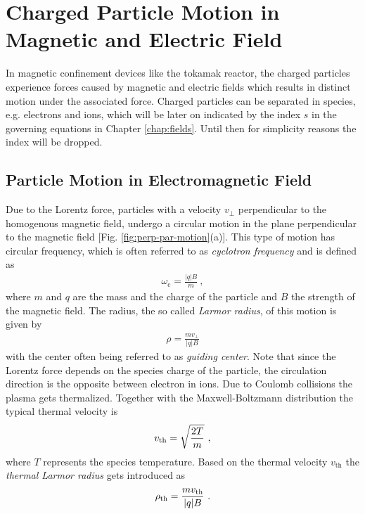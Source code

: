 \section{Charged Particle Motion in Magnetic and Electric Field}
\label{sec:motion}

In magnetic confinement devices like the tokamak reactor, the charged particles experience forces caused by magnetic and electric fields which results in distinct motion under the associated force. Charged particles can be separated in species, e.g. electrons and ions, which will be later on indicated by the index $s$ in the governing equations in Chapter \ref{chap:fields}. Until then for simplicity reasons the index will be dropped.

\subsection{Particle Motion in Electromagnetic Field}
\label{sub:motion}

Due to the Lorentz force, particles with a velocity $v_{\perp}$ perpendicular to the homogenous magnetic field, undergo a circular motion in the plane perpendicular to the magnetic field [Fig. \ref{fig:perp-par-motion}(a)]. This type of motion has circular frequency, which is often referred to as \textit{cyclotron frequency} and is defined as
\begin{gather}
    \omega_\mathrm{c} = \frac{|q|B}{m}~,
    \label{eq:cyclotron}
\end{gather}
where $m$ and $q$ are the mass and the charge of the particle and $B$ the strength of the magnetic field. The radius, the so called \textit{Larmor radius}, of this motion is given by
\begin{gather}
    \rho = \frac{mv_{\perp}}{|q|B}
    \label{eq:Larmorradius}
\end{gather}
with the center often being referred to as \textit{guiding center}. Note that since the Lorentz force depends on the species charge of the particle, the circulation direction is the opposite between electron in ions. Due to Coulomb collisions the plasma gets thermalized. Together with the Maxwell-Boltzmann distribution the typical thermal velocity is
\begin{gather}
    v_\mathrm{th} = \sqrt{\frac{2T}{m}}~,
    \label{eq:thermalVelocity}
\end{gather}
where $T$ represents the species temperature. Based on the thermal velocity $v_\mathrm{th}$ the \textit{thermal Larmor radius} gets introduced as
\begin{gather}
    \rho_{\mathrm{th}} = \frac{mv_\mathrm{th}}{|q|B}~.
    \label{eq:thermalLarmorradius}
\end{gather}
\bigskip

